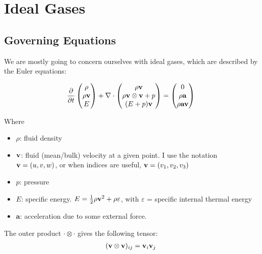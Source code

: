 \newpage
\section{Ideal Gases}





\subsection{Governing Equations}

We are mostly going to concern ourselves with ideal gases, which are described by the Euler equations:


\begin{align}
	\frac{\partial}{\partial t}
	\begin{pmatrix}
		\rho \\
		\rho \mathbf{v} \\
		E
	\end{pmatrix}
	+
	\nabla \cdot
	\begin{pmatrix}
		\rho \mathbf{v}\\
		\rho \mathbf{v} \otimes \mathbf{v} + p\\
		(E + p) \mathbf{v}
	\end{pmatrix}
	=
	\begin{pmatrix}
		0\\
		\rho \mathbf{a}\\
		\rho \mathbf{a} \mathbf{v}
	\end{pmatrix}
\end{align}



Where
\begin{itemize}
	\item $\rho$: fluid density
	\item $\mathbf{v}$: fluid (mean/bulk) velocity at a given point. I use the notation $\mathbf{v} = (u, v, w)$, or when indices are useful, $\mathbf{v} = (v_1, v_2, v_3)$
	\item $p$: pressure
	\item $E$: specific energy. $E = \frac{1}{2} \rho \mathbf{v}^2 + \rho \varepsilon$, with $\varepsilon$ = specific internal thermal energy
	\item $\mathbf{a}$: acceleration due to some external force.
\end{itemize}

The outer product $\cdot \otimes \cdot$ gives the following tensor:
\begin{align}
	(\mathbf{v} \otimes \mathbf{v})_{ij} = \mathbf{v}_i \mathbf{v}_j
\end{align}



